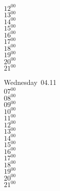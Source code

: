 \documentclass[11pt,a4paper]{book}\usepackage[]{graphicx}\usepackage[]{color}
\begin{document}
{{{{{{{{{{{{{{{{{\begin{tcolorbox}
{$12^{00}$\\
$13^{00}$\\
$14^{00}$\\
$15^{00}$\\
$16^{00}$\\
$17^{00}$\\
$18^{00}$\\
$19^{00}$\\
$20^{00}$\\
$21^{00}$}\\
\end{tcolorbox}
%
\begin{tcolorbox}
Wednesday~04.11\\
{ 
$07^{00}$\\
$08^{00}$\\
$09^{00}$\\
$10^{00}$\\
$11^{00}$\\
$12^{00}$\\
$13^{00}$\\
$14^{00}$\\
$15^{00}$\\
$16^{00}$\\
$17^{00}$\\
$18^{00}$\\
$19^{00}$\\
$20^{00}$\\
$21^{00}$}\\
\end{tcolorbox}
\clearpage
%
}}}}}}}}}}}}}}}}}
\end{document}
